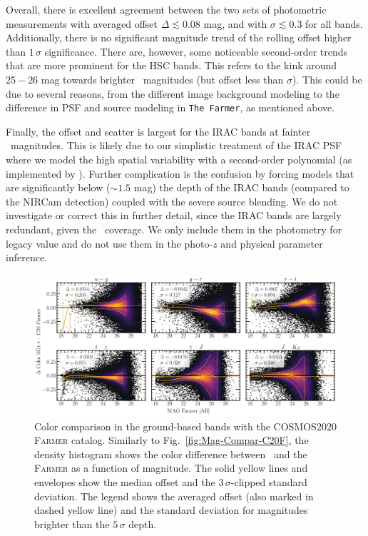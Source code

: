 \documentclass[longauth]{aa}
\begin{document}
Overall, there is excellent agreement between the two sets of photometric measurements with averaged offset $\Delta \lesssim0.08$ mag, and with $\sigma \lesssim 0.3$ for all bands. Additionally, there is no significant magnitude trend of the rolling offset higher than $1\, \sigma$ significance. There are, however, some noticeable second-order trends that are more prominent for the HSC bands. This refers to the kink around $25-26$ mag towards brighter \SEpp\ magnitudes (but offset less than $\sigma$). This could be due to several reasons, from the different image background modeling to the difference in PSF and source modeling in \texttt{The Farmer}, as mentioned above. 

Finally, the offset and scatter is largest for the IRAC bands at fainter \SEpp\ magnitudes. This is likely due to our simplistic treatment of the IRAC PSF where we model the high spatial variability with a second-order polynomial (as implemented by \psfex). Further complication is the confusion by forcing models that are significantly below ($\sim 1.5$ mag) the depth of the IRAC bands (compared to the NIRCam detection) coupled with the severe source blending. We do not investigate or correct this in further detail, since the IRAC bands are largely redundant, given the \JWST\ coverage. We only include them in the photometry for legacy value and do not use them in the photo-$z$ and physical parameter inference.

\begin{figure}[ht!]
\centering
\includegraphics[width=1\textwidth]{figures/Color-Compar-C20F.pdf}
\caption{Color comparison in the ground-based bands with the COSMOS2020 \textsc{Farmer} catalog. Similarly to Fig.~\ref{fig:Mag-Compar-C20F}, the density histogram shows the color difference between \SEpp\ and the \textsc{Farmer} as a function of magnitude. The solid yellow lines and envelopes show the median offset and the $3\,\sigma$-clipped standard deviation. The legend shows the averaged offset (also marked in dashed yellow line) and the standard deviation for magnitudes brighter than the $5\,\sigma$ depth.}
\label{fig:Color-Compar-C20F}
\end{figure}
\end{document}
